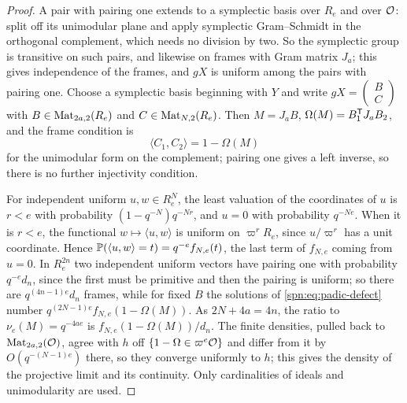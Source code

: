 \begin{proof}
A pair with pairing one extends to a symplectic basis over $R_e$ and over $\mathcal{O}$: split off its
unimodular plane and apply symplectic Gram--Schmidt in the orthogonal complement, which needs no
division by two. So the symplectic group is transitive on such pairs, and likewise on frames with
Gram matrix $J_a$; this gives independence of the frames, and $gX$ is uniform among the pairs
with pairing one. Choose a symplectic basis beginning with $Y$ and write
$gX=\left(\begin{smallmatrix}B\\C\end{smallmatrix}\right)$ with $B\in\operatorname{Mat}_{2a,2}(R_e)$ and
$C\in\operatorname{Mat}_{N,2}(R_e)$. Then $M=J_aB$, $\Omega(M)=B_1^{\mathsf{T}}J_aB_2$, and the frame condition
is
\begin{equation}\label{spn:eq:padic-defect}
 \langle C_1,C_2\rangle=1-\Omega(M)
\end{equation}
for the unimodular form on the complement; pairing one gives a left inverse, so there is no
further injectivity condition.

For independent uniform $u,w\in R_e^N$, the least valuation of the coordinates of $u$ is $r<e$
with probability $(1-q^{-N})q^{-Nr}$, and $u=0$ with probability $q^{-Ne}$. When it is $r<e$,
the functional $w\mapsto\langle u,w\rangle$ is uniform on $\varpi^rR_e$, since $u/\varpi^r$ has a
unit coordinate. Hence $\mathbb{P}(\langle u,w\rangle=t)=q^{-e}f_{N,e}(t)$, the last term of
$f_{N,e}$ coming from $u=0$. In $R_e^{2n}$ two independent uniform vectors have pairing one with
probability $q^{-e}d_n$, since the first must be primitive and then the pairing is uniform; so
there are $q^{(4n-1)e}d_n$ frames, while for fixed $B$ the solutions of
\eqref{spn:eq:padic-defect} number $q^{(2N-1)e}f_{N,e}(1-\Omega(M))$. As $2N+4a=4n$, the ratio
to $\nu_e(M)=q^{-4ae}$ is $f_{N,e}(1-\Omega(M))/d_n$. The finite densities, pulled back to
$\operatorname{Mat}_{2a,2}(\mathcal{O})$, agree with $h$ off $\{1-\Omega\in\varpi^e\mathcal{O}\}$ and differ from it by
$O(q^{-(N-1)e})$ there, so they converge uniformly to $h$; this gives the density of the
projective limit and its continuity. Only cardinalities of ideals and unimodularity are used.


\end{proof}
